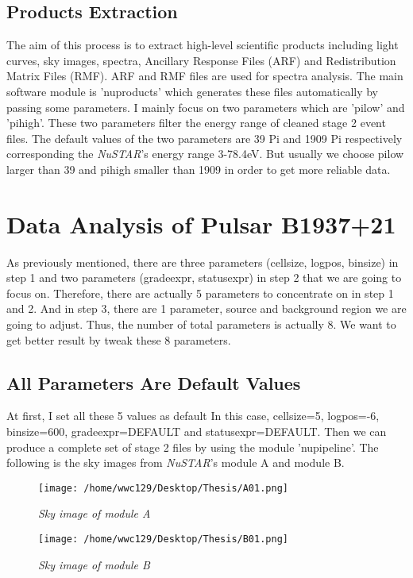 \documentclass[12pt]{report}
\begin{document}
    \subsection{Products Extraction}
        The aim of this process is to extract high-level scientific products including light curves, sky images,
        spectra, Ancillary Response Files (ARF) and Redistribution Matrix Files (RMF). ARF and RMF files are used 
        for spectra analysis. The main software module is 'nuproducts' which generates these files automatically by 
        passing some parameters. I mainly focus on two parameters which are 'pilow' and 'pihigh'. These two 
        parameters filter the energy range of cleaned stage 2 event files. The default values of the two parameters
        are 39 Pi and 1909 Pi respectively corresponding the \textit{NuSTAR}'s energy range 3-78.4eV. But usually we choose 
        pilow larger than 39 and pihigh smaller than 1909 in order to get more reliable data.
                

    
    \section{Data Analysis of Pulsar B1937+21}
        As previously mentioned, there are three parameters (cellsize, logpos, binsize) in step 1 and two 
        parameters (gradeexpr, statusexpr) in step 2 that we are going to focus on. 
        Therefore, there are actually 5 parameters to concentrate on in step 1 and 2. And in step 3, there are 1 
        parameter, source and background region we are going to adjust. Thus, the number of total parameters is
        actually 8. We want to get better result by tweak these 8 parameters.\\
        \subsection{All Parameters Are Default Values}
          \indent 
          At first, I set all these 5 values as default  
          In this case, cellsize=5, logpos=-6, binsize=600, gradeexpr=DEFAULT and statusexpr=DEFAULT.
          Then we can produce a complete set of stage 2 files by using the module 'nupipeline'. The following is 
          the sky images from \textit{NuSTAR}'s module A and module B. 
        \begin{figure}[h]
          \hspace{0.7cm}
          \begin{minipage}{0.45\textwidth} 
            \centering 
            \texttt{[image: /home/wwc129/Desktop/Thesis/A01.png]}
            \caption{\textit{\footnotesize Sky image of module A}}
          \end{minipage}
          \hspace{0.1cm} 
          \begin{minipage}{0.45\textwidth}
            \centering 
            \texttt{[image: /home/wwc129/Desktop/Thesis/B01.png]}
            \caption{\textit{\footnotesize Sky image of module B}}
          \end{minipage}
        \end{figure}
      
\end{document}
